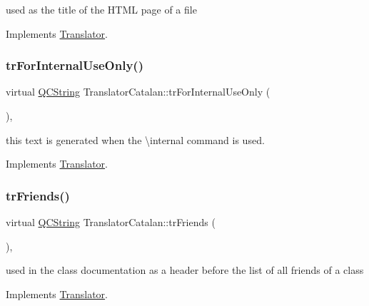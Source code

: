 used as the title of the H\+T\+ML page of a file 

Implements \mbox{\hyperlink{class_translator}{Translator}}.

\mbox{\label{class_translator_catalan_a362ae63c42cf1263d30754d62198c928}} 
\subsubsection{\texorpdfstring{trForInternalUseOnly()}{trForInternalUseOnly()}}
{\footnotesize\ttfamily virtual \mbox{\hyperlink{class_q_c_string}{Q\+C\+String}} Translator\+Catalan\+::tr\+For\+Internal\+Use\+Only (\begin{DoxyParamCaption}{ }\end{DoxyParamCaption})\hspace{0.3cm}{\ttfamily [inline]}, {\ttfamily [virtual]}}

this text is generated when the \textbackslash{}internal command is used. 

Implements \mbox{\hyperlink{class_translator}{Translator}}.

\mbox{\label{class_translator_catalan_a483fdc4880331e2643e411ba766b9c10}} 
\subsubsection{\texorpdfstring{trFriends()}{trFriends()}}
{\footnotesize\ttfamily virtual \mbox{\hyperlink{class_q_c_string}{Q\+C\+String}} Translator\+Catalan\+::tr\+Friends (\begin{DoxyParamCaption}{ }\end{DoxyParamCaption})\hspace{0.3cm}{\ttfamily [inline]}, {\ttfamily [virtual]}}

used in the class documentation as a header before the list of all friends of a class 

Implements \mbox{\hyperlink{class_translator}{Translator}}.

\mbox{\label{class_translator_catalan_a05f1b1c35fe663f1e4e86301c9c67065}} 
